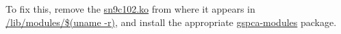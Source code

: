 \documentclass{article}         %
\begin{document}
To fix this, remove the \url{sn9c102.ko} from where it appears in
\url{/lib/modules/$(uname -r)},  %
and install the appropriate \url{gspca-modules} package.
\end{document}
